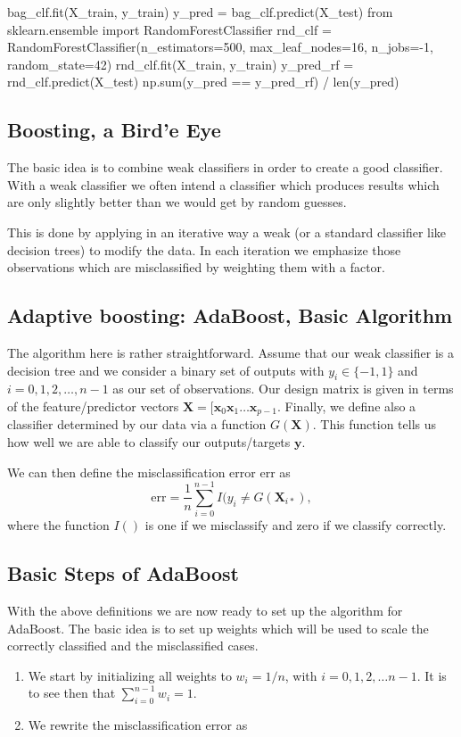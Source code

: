 \documentclass[%
oneside,                 %
final,                   %
10pt]{article}
\begin{document}
\bpycod
bag_clf.fit(X_train, y_train)
y_pred = bag_clf.predict(X_test)
from sklearn.ensemble import RandomForestClassifier
rnd_clf = RandomForestClassifier(n_estimators=500, max_leaf_nodes=16, n_jobs=-1, random_state=42)
rnd_clf.fit(X_train, y_train)
y_pred_rf = rnd_clf.predict(X_test)
np.sum(y_pred == y_pred_rf) / len(y_pred) 
\epycod





\subsection{Boosting, a Bird'e Eye}

The basic idea is to combine weak classifiers in order to create a good
classifier. With a weak classifier we often intend a classifier which
produces results which are only slightly better than we would get by
random guesses.

This is done by applying in an iterative way a weak (or a standard
classifier like decision trees) to modify the data. In each iteration
we emphasize those observations which are misclassified by weighting
them with a factor.


\subsection{Adaptive boosting: AdaBoost, Basic Algorithm}

The algorithm here is rather straightforward. Assume that our weak
classifier is a decision tree and we consider a binary set of outputs
with $y_i \in \{-1,1\}$ and $i=0,1,2,\dots,n-1$ as our set of
observations. Our design matrix is given in terms of the
feature/predictor vectors
$\bm{X}=[\bm{x}_0\bm{x}_1\dots\bm{x}_{p-1}$. Finally, we define also a
classifier determined by our data via a function $G(\bm{X})$. This function tells us how well we are able to classify our outputs/targets $\bm{y}$. 

We can then define the misclassification error $\mathrm{err}$ as
\[
\mathrm{err}=\frac{1}{n}\sum_{i=0}^{n-1}I(y_i\ne G(\bm{X}_{i*}),
\]
where the function $I()$ is one if we misclassify and zero if we classify correctly. 

\subsection{Basic Steps of AdaBoost}

With the above definitions we are now ready to set up the algorithm for AdaBoost.
The basic idea is to set up weights which will be used to scale the correctly classified and the misclassified cases.
\begin{enumerate}
\item We start by initializing all weights to $w_i = 1/n$, with $i=0,1,2,\dots n-1$. It is to see then that $\sum_{i=0}^{n-1}w_i = 1$.

\item We rewrite the misclassification error as 
\end{enumerate}
\end{document}
